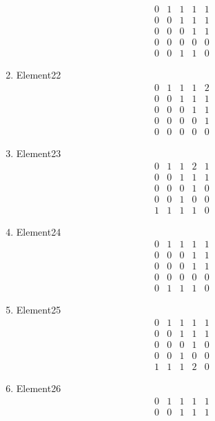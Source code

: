 \documentclass[12pt]{article}
\begin{document}
\begin{multicols}{3}
\begin{enumerate}
\begin{equation*}
\begin{array}{ccccc}
0&1&1&1&1\\
0&0&1&1&1\\
0&0&0&1&1\\
0&0&0&0&0\\
0&0&1&1&0
\end{array}
\end{equation*}
\item Element22
\begin{equation*}
\begin{array}{ccccc}
0&1&1&1&2\\
0&0&1&1&1\\
0&0&0&1&1\\
0&0&0&0&1\\
0&0&0&0&0
\end{array}
\end{equation*}
\item Element23
\begin{equation*}
\begin{array}{ccccc}
0&1&1&2&1\\
0&0&1&1&1\\
0&0&0&1&0\\
0&0&1&0&0\\
1&1&1&1&0
\end{array}
\end{equation*}
\item Element24
\begin{equation*}
\begin{array}{ccccc}
0&1&1&1&1\\
0&0&0&1&1\\
0&0&0&1&1\\
0&0&0&0&0\\
0&1&1&1&0
\end{array}
\end{equation*}
\item Element25
\begin{equation*}
\begin{array}{ccccc}
0&1&1&1&1\\
0&0&1&1&1\\
0&0&0&1&0\\
0&0&1&0&0\\
1&1&1&2&0
\end{array}
\end{equation*}
\item Element26
\begin{equation*}
\begin{array}{ccccc}
0&1&1&1&1\\
0&0&1&1&1\\

\end{array}
\end{equation*}
\end{enumerate}
\end{multicols}
\end{document}
